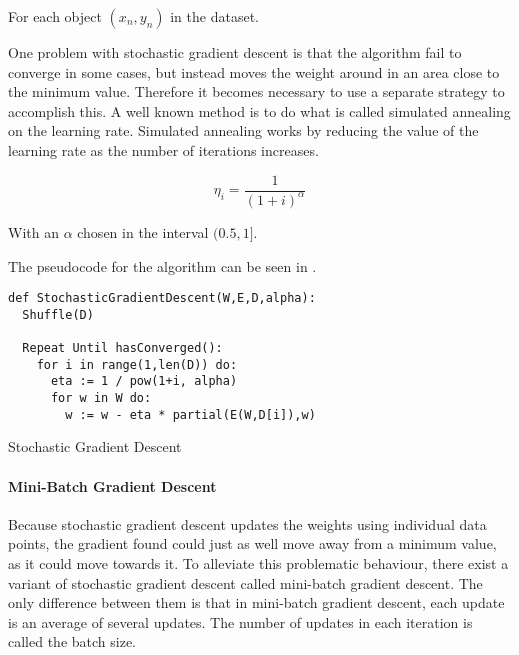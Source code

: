 For each object $(x_n, y_n)$ in the dataset.

One problem with stochastic gradient descent is that the algorithm fail to converge in some cases, but instead moves the weight around in an area close to the minimum value.
Therefore it becomes necessary to use a separate strategy to accomplish this.
A well known method is to do what is called simulated annealing on the learning rate.
Simulated annealing works by reducing the value of the learning rate as the number of iterations increases.

$$\eta_i = \frac{1}{(1+i)^\alpha}$$

With an $\alpha$ chosen in the interval $(0.5,1]$. 


The pseudocode for the algorithm can be seen in .
\begin{listing}[H]
\begin{verbatim}
def StochasticGradientDescent(W,E,D,alpha):
  Shuffle(D)

  Repeat Until hasConverged():
    for i in range(1,len(D)) do:
      eta := 1 / pow(1+i, alpha)
      for w in W do: 
        w := w - eta * partial(E(W,D[i]),w)

\end{verbatim}
\caption{Stochastic Gradient Descent}
\label{lst:sgt}
\end{listing}

\paragraph{Mini-Batch Gradient Descent}\label{sec:mini-batch}
Because stochastic gradient descent updates the weights using individual data points, the gradient found could just as well move away from a minimum value, as it could move towards it. 
To alleviate this problematic behaviour, there exist a variant of stochastic gradient descent called mini-batch gradient descent. 
The only difference between them is that in mini-batch gradient descent, each update is an average of several updates.
The number of updates in each iteration is called the batch size.







